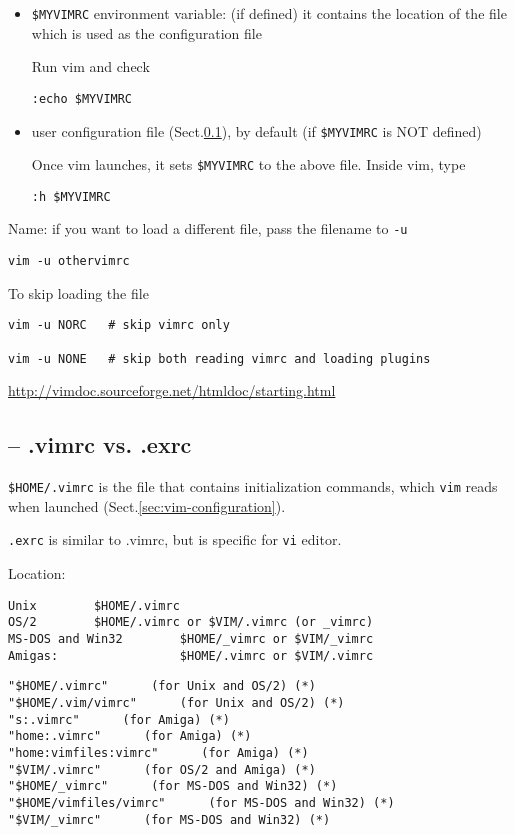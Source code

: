 \begin{itemize}
  \item \verb!$MYVIMRC! environment variable: (if defined) it contains the
  location of the file which is used as the configuration file

Run vim and check
\begin{verbatim}
:echo $MYVIMRC
\end{verbatim}
  
  \item user configuration file  (Sect.\ref{sec:.vimrc}), by default (if
  \verb!$MYVIMRC! is NOT defined)
  
Once vim launches, it sets \verb!$MYVIMRC! to the above file. Inside vim, type
\begin{verbatim}
:h $MYVIMRC
\end{verbatim}

\end{itemize}

Name: if you want to load a different file, pass the filename to \verb!-u!
\begin{verbatim}
vim -u othervimrc
\end{verbatim}

To skip loading the file
\begin{verbatim}
vim -u NORC   # skip vimrc only

vim -u NONE   # skip both reading vimrc and loading plugins
\end{verbatim}
\url{http://vimdoc.sourceforge.net/htmldoc/starting.html}


\subsection{-- .vimrc vs. .exrc}
\label{sec:.vimrc}
\label{sec:.exrc}

\verb!$HOME/.vimrc! is the file that contains initialization commands, which
\verb!vim! reads when launched (Sect.\ref{sec:vim-configuration}).

\verb!.exrc! is similar to .vimrc, but is specific for \verb!vi! editor.

Location:
\begin{verbatim}
Unix		$HOME/.vimrc
OS/2		$HOME/.vimrc or $VIM/.vimrc (or _vimrc)
MS-DOS and Win32		$HOME/_vimrc or $VIM/_vimrc
Amigas:					$HOME/.vimrc or $VIM/.vimrc
\end{verbatim}

\begin{verbatim}
"$HOME/.vimrc"      (for Unix and OS/2) (*)
"$HOME/.vim/vimrc"      (for Unix and OS/2) (*)
"s:.vimrc"      (for Amiga) (*)
"home:.vimrc"      (for Amiga) (*)
"home:vimfiles:vimrc"      (for Amiga) (*)
"$VIM/.vimrc"      (for OS/2 and Amiga) (*)
"$HOME/_vimrc"      (for MS-DOS and Win32) (*)
"$HOME/vimfiles/vimrc"      (for MS-DOS and Win32) (*)
"$VIM/_vimrc"      (for MS-DOS and Win32) (*)
\end{verbatim}



